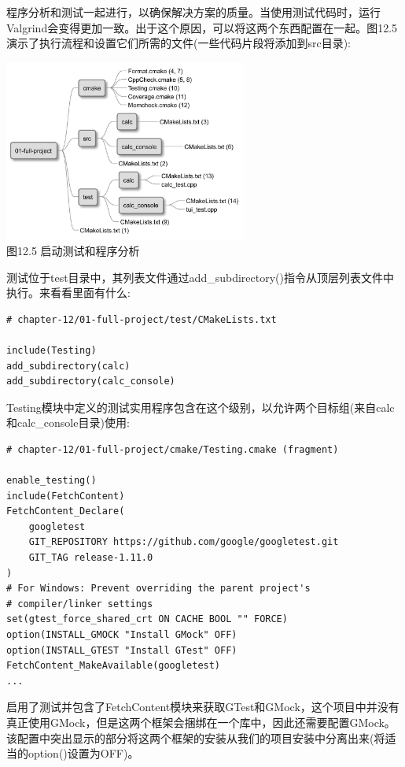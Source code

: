 

程序分析和测试一起进行，以确保解决方案的质量。当使用测试代码时，运行Valgrind会变得更加一致。出于这个原因，可以将这两个东西配置在一起。图12.5演示了执行流程和设置它们所需的文件(一些代码片段将添加到src目录):

\begin{center}
\includegraphics[width=0.6\textwidth]{content/3/chapter12/images/5.jpg}\\
图12.5 启动测试和程序分析
\end{center}

测试位于test目录中，其列表文件通过add\_subdirectory()指令从顶层列表文件中执行。来看看里面有什么:

\begin{lstlisting}[style=styleCMake]
# chapter-12/01-full-project/test/CMakeLists.txt

include(Testing)
add_subdirectory(calc)
add_subdirectory(calc_console)
\end{lstlisting}

Testing模块中定义的测试实用程序包含在这个级别，以允许两个目标组(来自calc和calc\_console目录)使用:

\begin{lstlisting}[style=styleCMake]
# chapter-12/01-full-project/cmake/Testing.cmake (fragment)

enable_testing()
include(FetchContent)
FetchContent_Declare(
	googletest
	GIT_REPOSITORY https://github.com/google/googletest.git
	GIT_TAG release-1.11.0
)
# For Windows: Prevent overriding the parent project's
# compiler/linker settings
set(gtest_force_shared_crt ON CACHE BOOL "" FORCE)
option(INSTALL_GMOCK "Install GMock" OFF)
option(INSTALL_GTEST "Install GTest" OFF)
FetchContent_MakeAvailable(googletest)
...
\end{lstlisting}

启用了测试并包含了FetchContent模块来获取GTest和GMock，这个项目中并没有真正使用GMock，但是这两个框架会捆绑在一个库中，因此还需要配置GMock。该配置中突出显示的部分将这两个框架的安装从我们的项目安装中分离出来(将适当的option()设置为OFF)。

